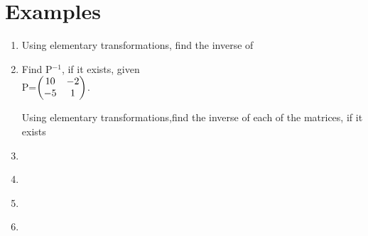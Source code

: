 \documentclass[journal,12pt,twocolumn]{IEEEtran}
\renewcommand\thesection{\arabic{section}}
\begin{document}
\section{Examples}
\renewcommand{\theequation}{\theenumi}
\begin{enumerate}[label=\thesection.\arabic*.,ref=\thesection.\theenumi]

\item Using elementary transformations, find the inverse of   
   \\
  \solution
  
    \item Find P$^{-1}$, if it exists, given \\
    P=$\begin{pmatrix} 10 &-2\\-5 &1\end{pmatrix}$.\\
    \solution
    
 
Using elementary transformations,find the inverse of each of the matrices, if it exists \\
  \item {}\\
\solution
    
  \item {}\\
\solution
    
  \item {}\\
\solution
    
%
  
  \item   
{}\\
%


\end{enumerate}
\end{document}
